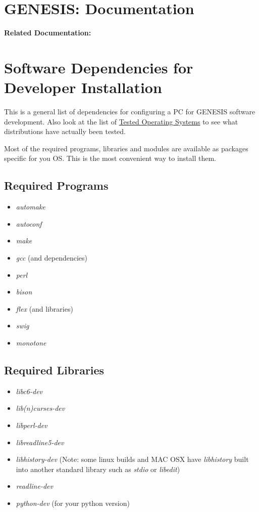 \documentclass[12pt]{article}
\begin{document}
\section*{GENESIS: Documentation}

{\bf Related Documentation:}

\section*{Software Dependencies for Developer Installation}

This is a general list of dependencies for configuring a PC for
GENESIS software development.  Also look at the list of \href{../tested-distributions/tested-distributions.tex}{Tested Operating Systems} to see what distributions have actually
been tested.

Most of the required programs, libraries and modules are available as
packages specific for you OS.  This is the most convenient way to install them.

\subsection*{Required Programs}

\begin{itemize}
\item {\it automake}
\item {\it autoconf}
\item {\it make}
\item {\it gcc} (and dependencies)
\item {\it perl}
\item {\it bison}
\item {\it flex} (and libraries)
\item {\it swig}
\item {\it monotone}
\end{itemize} 

\subsection*{Required Libraries}

\begin{itemize}
\item {\it libc6-dev}
\item {\it lib(n)curses-dev}
\item {\it libperl-dev}
\item {\it libreadline5-dev}
\item {\it libhistory-dev} (Note: some linux builds and MAC OSX have
  {\it libhistory} built into another standard library such as {\it
    stdio} or {\it libedit})
\item {\it readline-dev}
\item {\it python-dev} (for your python version)
\end{itemize} 
\end{document}

